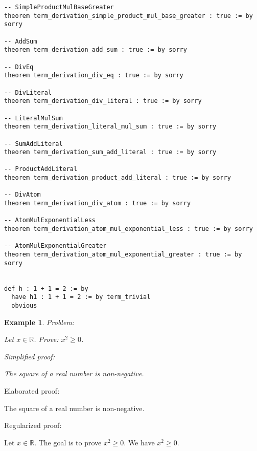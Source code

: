 \documentclass{article}
\newtheorem{example}{Example}
\begin{document}
\begin{tcolorbox}[colback=white!10, width=\linewidth]
\begin{lstlisting}[language=Lean4]
-- SimpleProductMulBaseGreater
theorem term_derivation_simple_product_mul_base_greater : true := by sorry

-- AddSum
theorem term_derivation_add_sum : true := by sorry

-- DivEq
theorem term_derivation_div_eq : true := by sorry

-- DivLiteral
theorem term_derivation_div_literal : true := by sorry

-- LiteralMulSum
theorem term_derivation_literal_mul_sum : true := by sorry

-- SumAddLiteral
theorem term_derivation_sum_add_literal : true := by sorry

-- ProductAddLiteral
theorem term_derivation_product_add_literal : true := by sorry

-- DivAtom
theorem term_derivation_div_atom : true := by sorry

-- AtomMulExponentialLess
theorem term_derivation_atom_mul_exponential_less : true := by sorry

-- AtomMulExponentialGreater
theorem term_derivation_atom_mul_exponential_greater : true := by sorry


def h : 1 + 1 = 2 := by
  have h1 : 1 + 1 = 2 := by term_trivial
  obvious

\end{lstlisting}
\end{tcolorbox}


\begin{example}
Problem:
\begin{tcolorbox}[colback=yellow!10, width=\linewidth]
Let $x\in\mathbb{R}$. Prove: $x^2\ge 0$.
\end{tcolorbox}

Simplified proof:
\begin{tcolorbox}[colback=blue!10, width=\linewidth]
The square of a real number is non-negative.
\end{tcolorbox}
\end{example}

Elaborated proof:
\begin{tcolorbox}[colback=green!10, width=\linewidth]
The square of a real number is non-negative.
\end{tcolorbox}

Regularized proof:
\begin{tcolorbox}[colback=red!10, width=\linewidth]
Let $x\in\mathbb{R}$.
The goal is to prove ${{x}}^2 \ge 0$.
We have ${{x}}^2 \ge 0$.
\end{tcolorbox}
\end{document}
